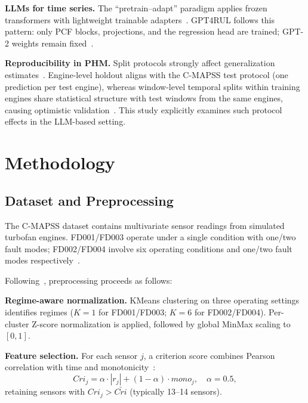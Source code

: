 \documentclass[10pt,twocolumn]{article}
\begin{document}
\textbf{LLMs for time series.}
The ``pretrain--adapt'' paradigm applies frozen transformers with lightweight trainable adapters~\cite{radford2019,tolstikhin2021}.
GPT4RUL follows this pattern: only PCF blocks, projections, and the regression head are trained; GPT-2 weights remain fixed~\cite{tan2025}.

\textbf{Reproducibility in PHM.}
Split protocols strongly affect generalization estimates~\cite{saxena2008}.
Engine-level holdout aligns with the C-MAPSS test protocol (one prediction per test engine), whereas window-level temporal splits within training engines share statistical structure with test windows from the same engines, causing optimistic validation~\cite{tan2025}.
This study explicitly examines such protocol effects in the LLM-based setting.

\section{Methodology}

\subsection{Dataset and Preprocessing}

The C-MAPSS dataset contains multivariate sensor readings from simulated turbofan engines.
FD001/FD003 operate under a single condition with one/two fault modes; FD002/FD004 involve six operating conditions and one/two fault modes respectively~\cite{saxena2008}.

Following~\cite{tan2025}, preprocessing proceeds as follows:

\textbf{Regime-aware normalization.}
KMeans clustering on three operating settings identifies regimes ($K\!=\!1$ for FD001/FD003; $K\!=\!6$ for FD002/FD004).
Per-cluster Z-score normalization is applied, followed by global MinMax scaling to $[0,1]$.

\textbf{Feature selection.}
For each sensor $j$, a criterion score combines Pearson correlation with time and monotonicity~\cite{tan2025}:
\begin{equation}
  Cri_j = \alpha \cdot |r_j| + (1-\alpha) \cdot mono_j, \quad \alpha = 0.5,
\end{equation}
retaining sensors with $Cri_j > \bar{Cri}$ (typically 13--14 sensors).
\end{document}
